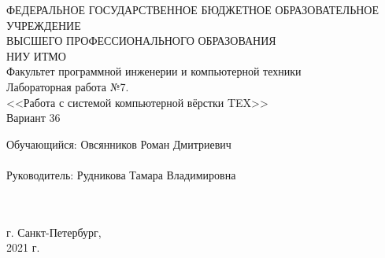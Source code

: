 \begin{center}
\hfill \break
\footnotesize{ФЕДЕРАЛЬНОЕ ГОСУДАРСТВЕННОЕ БЮДЖЕТНОЕ ОБРАЗОВАТЕЛЬНОЕ УЧРЕЖДЕНИЕ}\\ 
\footnotesize{ВЫСШЕГО ПРОФЕССИОНАЛЬНОГО ОБРАЗОВАНИЯ}\\
\footnotesize{{НИУ ИТМО}}\\
\hfill \break
\normalsize{Факультет программной инженерии и компьютерной техники }\\
\hfill \break
\hfill\break
\hfill \break
\hfill \break
\hfill \break
\hfill \break
\hfill \break
\large{Лабораторная работа №7. \\
<<Работа с системой компьютерной вёрстки TEX>>}\\
\hfill \break
\normalsize{Вариант 36}\\
\hfill \break
\hfill \break
\hfill \break
\hfill \break
\hfill \break
\hfill \break
\end{center}
 
\hfill \break
 

\begin{flushright}
\normalsize{ Обучающийся: Овсянников Роман Дмитриевич \\\\
Руководитель: Рудникова Тамара Владимировна}\\\\\\
\end{flushright}

\hfill \break
\hfill \break
\hfill \break
\hfill \break
\hfill \break
\hfill \break
\hfill \break
\hfill \break
\hfill \break
\hfill \break
\begin{center} г. Санкт-Петербург,\\ 2021 г. \end{center}
\thispagestyle{empty}